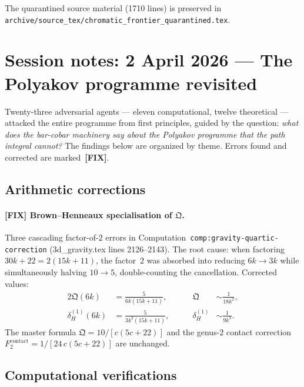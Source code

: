 \documentclass[11pt]{article}
\begin{document}
The quarantined source material (1710 lines) is preserved in
\texttt{archive/source\_tex/chromatic\_frontier\_quarantined.tex}.

\section{Session notes: 2 April 2026 --- The Polyakov programme revisited}
\label{sec:session-2apr26-polyakov}

Twenty-three adversarial agents --- eleven computational, twelve
theoretical --- attacked the entire programme from first principles,
guided by the question: \emph{what does the bar-cobar machinery say
about the Polyakov programme that the path integral cannot?}  The
findings below are organized by theme.  Errors found and corrected are
marked~{\bfseries [FIX]}.

\subsection{Arithmetic corrections}
\label{subsec:polyakov-arith}

\paragraph{{\bfseries [FIX]} Brown--Henneaux specialisation of
$\mathfrak{Q}$.}  Three cascading factor-of-$2$ errors in
Computation~\texttt{comp:gravity-quartic-correction}
(3d\_gravity.tex lines 2126--2143).  The root cause: when factoring
$30k+22 = 2(15k+11)$, the factor~$2$ was absorbed into reducing
$6k \to 3k$ while simultaneously halving $10 \to 5$, double-counting
the cancellation.  Corrected values:
\begin{alignat*}{2}
\mathfrak{Q}(6k) &= \frac{5}{6k(15k+11)},
&\qquad \mathfrak{Q} &\sim \frac{1}{18k^2},\\
\delta_H^{(1)}(6k) &= \frac{5}{3k^2(15k+11)},
&\qquad \delta_H^{(1)} &\sim \frac{1}{9k^3}.
\end{alignat*}
The master formula $\mathfrak{Q} = 10/[c(5c+22)]$ and the genus-$2$
contact correction $F_2^{\mathrm{contact}} = 1/[24\,c(5c+22)]$ are
unchanged.

\subsection{Computational verifications}
\label{subsec:polyakov-comput}
\end{document}
